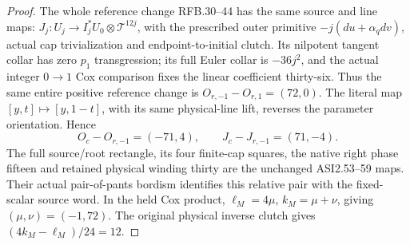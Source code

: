 \begin{proof}
The whole reference change RFB.30--44 has the same source and line maps:
\(J_j:U_j\to I_j^*U_0\otimes\mathcal T^{12j}\), with the prescribed
outer primitive \(-j(du+\alpha_qdv)\), actual cap trivialization and
endpoint-to-initial clutch.  Its nilpotent tangent collar has zero
\(p_1\) transgression; its full Euler collar is \(-36j^2\), and the
actual integer \(0\to1\) Cox comparison fixes the linear coefficient
thirty-six.  Thus the same entire positive reference change is
\(O_{r,-1}-O_{r,1}=(72,0)\).  The literal map
\([y,t]\mapsto[y,1-t]\), with its same physical-line lift, reverses
the parameter orientation.  Hence
\[
 O_c-O_{r,-1}=(-71,4),\qquad J_c-J_{r,-1}=(71,-4).
\]
The full source/root rectangle, its four finite-cap squares, the native
right phase fifteen and retained physical winding thirty are the
unchanged ASI2.53--59 maps.  Their actual pair-of-pants bordism identifies
this relative pair with the fixed-scalar source word.  In the held Cox
product, \(\ell_M=4\mu\), \(k_M=\mu+\nu\), giving
\((\mu,\nu)=(-1,72)\).  The original physical inverse clutch gives
\((4k_M-\ell_M)/24=12\).


\end{proof}

